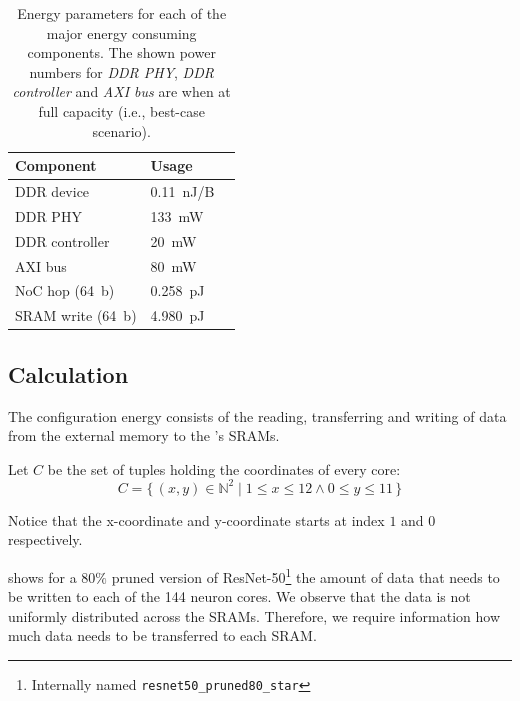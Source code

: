 \begin{table}[hbtp]
\centering
\begin{tabular}{@{}lll@{}}
\toprule
\textbf{Component}      & \textbf{Usage}  &  \\
\midrule
DDR device              & \SI{0.11}{nJ/B} &  \\
DDR PHY                 & \SI{133}{mW}    &  \\
DDR controller          & \SI{20}{mW}     &  \\
AXI bus                 & \SI{80}{mW}     &  \\
NoC hop (\SI{64}{b})    & \SI{0.258}{pJ}  &  \\
SRAM write (\SI{64}{b}) & \SI{4.980}{pJ}  &  \\
\bottomrule
\end{tabular}
\caption{Energy parameters for each of the major energy consuming components. The shown power numbers for \textit{DDR PHY}, \textit{DDR controller} and \textit{AXI bus} are when at full capacity (i.e., best-case scenario).}
\label{tab:energy_parameters_ddr}
\end{table}

\subsection{Calculation}
The configuration energy consists of the reading, transferring and writing of data from the external memory to the \graicore{}'s SRAMs. 

Let $C$ be the set of tuples holding the coordinates of every core:
\begin{equation*}
    C = \{\,\left(x,y\right) \in \mathbb{N}^2 \mid 1 \leq x \leq 12 \wedge 0 \leq y \leq 11 \,\} 
\end{equation*}

Notice that the x-coordinate and y-coordinate starts at index $1$ and $0$ respectively.

 shows for a $80\%$ pruned version of ResNet-50\footnote{Internally named \texttt{resnet50\_pruned80\_star}} the amount of data that needs to be written to each of the 144 neuron cores.
We observe that the data is not uniformly distributed across the SRAMs.
Therefore, we require information how much data needs to be transferred to each SRAM.

